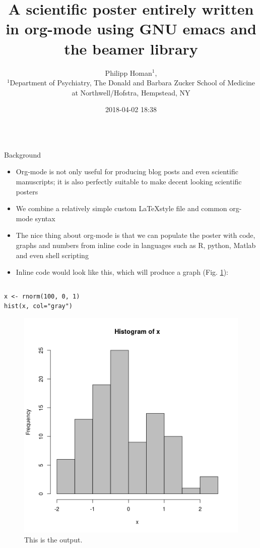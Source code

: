 \documentclass[final]{beamer}
\date{}
\author{
Philipp Homan$^{1}$,
\\
\normalsize{$^{1}$Department of Psychiatry,}
\normalsize{The Donald and Barbara Zucker}
\normalsize{School of Medicine at Northwell/Hofstra,}
\normalsize{Hempstead, NY}
}
\date{2018-04-02 18:38}
\title{A scientific poster entirely written in org-mode using GNU emacs and the beamer library}
\begin{document}
\begin{frame}[fragile,label={sec:org727f6f5}]{}
 \begin{columns}
\begin{column}[t]{0.45\columnwidth}
\begin{block}{Background}
\begin{itemize}
\item Org-mode is not only useful for producing blog posts and even
scientific manuscripts; it is also perfectly suitable to make 
decent looking scientific posters
\item We combine a relatively simple custom \LaTeX style file and common
org-mode syntax
\item The nice thing about org-mode is that we can populate the poster with
code, graphs and numbers from inline code in languages such as R,
python, Matlab and even shell scripting
\item Inline code would look like this, which will produce a graph
(Fig. \ref{fig:orgaca79ae}):
\end{itemize}

\begin{columns}
\begin{column}[T]{0.48\columnwidth}
\begin{verbatim}
x <- rnorm(100, 0, 1)
hist(x, col="gray")
\end{verbatim}


\begin{figure}[htbp]
\centering
\includegraphics[width=.9\linewidth]{3.png}
\caption{\label{fig:orgaca79ae}
This is the output.}
\end{figure}
\end{column}
\end{columns}
\end{block}


\end{column}
\end{columns}
\end{frame}
\end{document}
